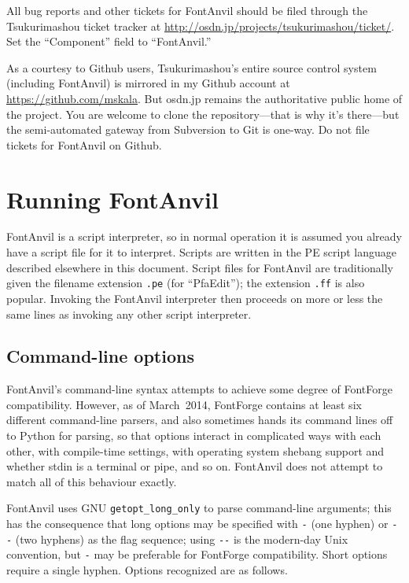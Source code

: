 \documentclass[11pt]{report}
\begin{document}
All bug reports and other tickets for FontAnvil should be filed through
the Tsukurimashou ticket tracker at
\url{http://osdn.jp/projects/tsukurimashou/ticket/}.  Set the
``Component'' field to ``FontAnvil.''

As a courtesy to Github users, Tsukurimashou's entire source control system
(including FontAnvil) is mirrored in my Github account at
\url{https://github.com/mskala}.  But osdn.jp remains the
authoritative public home of the project.  You are welcome to clone the
repository---that is why it's there---but the semi-automated gateway from
Subversion to Git is one-way.  Do not file tickets for FontAnvil on Github.

\clearpage


\chapter{Running FontAnvil}

FontAnvil is a script interpreter, so in normal operation it is assumed you
already have a script file for it to interpret.  Scripts are written in the
PE script language described elsewhere in this document.  Script files for
FontAnvil are traditionally given the filename extension \texttt{.pe} (for
``PfaEdit''); the extension \texttt{.ff} is also popular.  Invoking the
FontAnvil interpreter then proceeds on more or less the same lines as
invoking any other script interpreter.

\section{Command-line options}

\begin{framed}
FontAnvil's command-line syntax attempts to achieve some degree of FontForge
compatibility.  However, as of March~2014, FontForge contains at least six
different command-line
parsers,\footnotemark{} and
also sometimes hands its command lines off to Python for parsing, so that
options interact in complicated ways with each other, with compile-time
settings, with operating system shebang support and whether stdin is a
terminal or pipe, and so on.  FontAnvil does not attempt to match all of
this behaviour exactly.
\end{framed}


FontAnvil uses GNU \texttt{getopt\_long\_only} to parse command-line
arguments; this has the consequence that long options may be specified with
\texttt{-} (one hyphen) or \texttt{-{}-} (two hyphens) as the flag sequence;
using \texttt{-{}-} is the modern-day Unix convention, but \texttt{-} may be
preferable for FontForge compatibility.  Short options require a single
hyphen.  Options recognized are as follows.
\end{document}
